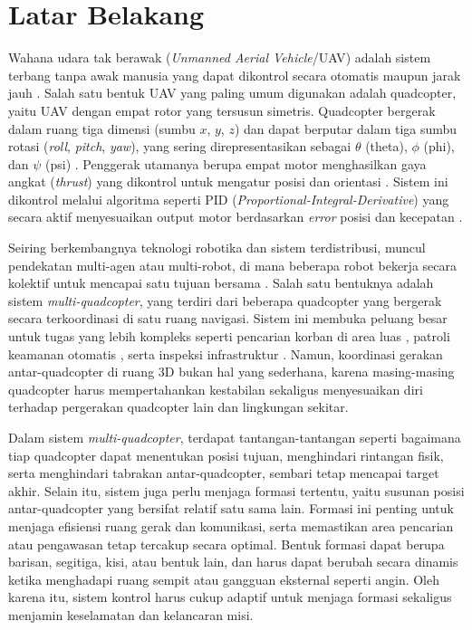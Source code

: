 \documentclass[12pt,a4paper]{report}
\numberwithin{equation}{chapter}
\begin{document}
\section{Latar Belakang}
Wahana udara tak berawak (\textit{Unmanned Aerial Vehicle}/UAV\label{abbr:uav}) adalah sistem terbang tanpa awak manusia yang dapat dikontrol secara otomatis maupun jarak jauh \cite{gettinger3DefiningDrones2024}. Salah satu bentuk UAV yang paling umum digunakan adalah quadcopter, yaitu UAV dengan empat rotor yang tersusun simetris. Quadcopter bergerak dalam ruang tiga dimensi (sumbu $x$\label{sym:x}, $y$\label{sym:y}, $z$\label{sym:z}) dan dapat berputar dalam tiga sumbu rotasi (\textit{roll}, \textit{pitch}, \textit{yaw}), yang sering direpresentasikan sebagai $\theta$\label{sym:theta} (theta), $\phi$\label{sym:phi} (phi), dan $\psi$\label{sym:psi} (psi) \cite{brescianiniNonlinearQuadrocopterAttitude2013a, johnBobzwikQuadcopter_SimCon2025}. Penggerak utamanya berupa empat motor menghasilkan gaya angkat (\textit{thrust}) yang dikontrol untuk mengatur posisi dan orientasi \cite{brescianiniNonlinearQuadrocopterAttitude2013a, johnBobzwikQuadcopter_SimCon2025}. Sistem ini dikontrol melalui algoritma seperti PID (\textit{Proportional-Integral-Derivative}) yang secara aktif menyesuaikan output motor berdasarkan \textit{error} posisi dan kecepatan \cite{johnBobzwikQuadcopter_SimCon2025}.

Seiring berkembangnya teknologi robotika dan sistem terdistribusi, muncul pendekatan multi-agen atau multi-robot, di mana beberapa robot bekerja secara kolektif untuk mencapai satu tujuan bersama \cite{kurochkinMethodsFormationControl2021}. Salah satu bentuknya adalah sistem \textit{multi-quadcopter}, yang terdiri dari beberapa quadcopter yang bergerak secara terkoordinasi di satu ruang navigasi. Sistem ini membuka peluang besar untuk tugas yang lebih kompleks seperti pencarian korban di area luas \cite{dealcantaraandradeAutonomousUnmannedAerial2019}, patroli keamanan otomatis \cite{borkarReconfigurableFormationsQuadrotors2020}, serta inspeksi infrastruktur \cite{sanchez-cuevasFullyActuatedAerialManipulator2020}. Namun, koordinasi gerakan antar-quadcopter di ruang 3D bukan hal yang sederhana, karena masing-masing quadcopter harus mempertahankan kestabilan sekaligus menyesuaikan diri terhadap pergerakan quadcopter lain dan lingkungan sekitar.

Dalam sistem \textit{multi-quadcopter}, terdapat tantangan-tantangan seperti bagaimana tiap quadcopter dapat menentukan posisi tujuan, menghindari rintangan fisik, serta menghindari tabrakan antar-quadcopter, sembari tetap mencapai target akhir. Selain itu, sistem juga perlu menjaga formasi tertentu, yaitu susunan posisi antar-quadcopter yang bersifat relatif satu sama lain. Formasi ini penting untuk menjaga efisiensi ruang gerak dan komunikasi, serta memastikan area pencarian atau pengawasan tetap tercakup secara optimal. Bentuk formasi dapat berupa barisan, segitiga, kisi, atau bentuk lain, dan harus dapat berubah secara dinamis ketika menghadapi ruang sempit atau gangguan eksternal seperti angin. Oleh karena itu, sistem kontrol harus cukup adaptif untuk menjaga formasi sekaligus menjamin keselamatan dan kelancaran misi.
\end{document}
